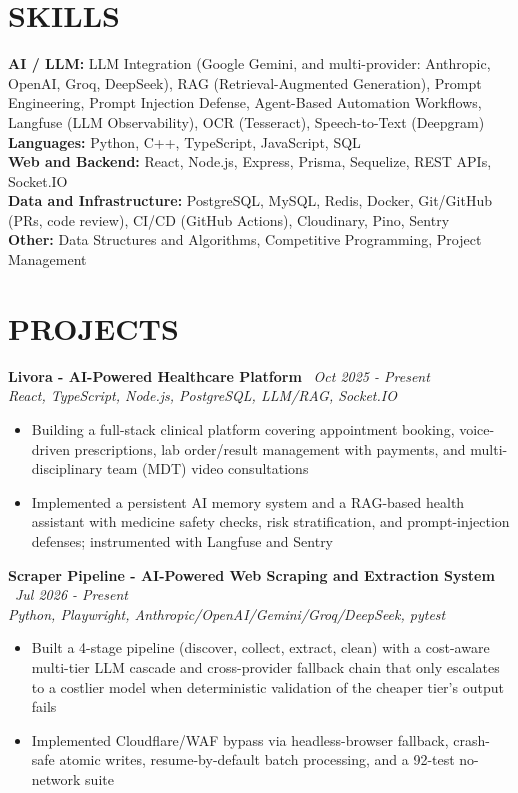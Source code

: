 \documentclass[10.5pt,a4paper]{article}
\newenvironment{tightitemize}{
  \begin{itemize}[leftmargin=15pt, itemsep=1pt, parsep=0pt, topsep=2pt]
}{
  \end{itemize}
}
\newcommand{\entrysimple}[2]{%
  \textbf{#1} \textbar\ \textit{#2}\\[1pt]
}
\begin{document}
\section*{SKILLS}
\textbf{AI / LLM:} LLM Integration (Google Gemini, and multi-provider: Anthropic, OpenAI, Groq, DeepSeek), RAG (Retrieval-Augmented Generation), Prompt Engineering, Prompt Injection Defense, Agent-Based Automation Workflows, Langfuse (LLM Observability), OCR (Tesseract), Speech-to-Text (Deepgram)\\[2pt]
\textbf{Languages:} Python, C++, TypeScript, JavaScript, SQL\\[2pt]
\textbf{Web and Backend:} React, Node.js, Express, Prisma, Sequelize, REST APIs, Socket.IO\\[2pt]
\textbf{Data and Infrastructure:} PostgreSQL, MySQL, Redis, Docker, Git/GitHub (PRs, code review), CI/CD (GitHub Actions), Cloudinary, Pino, Sentry\\[2pt]
\textbf{Other:} Data Structures and Algorithms, Competitive Programming, Project Management

\section*{PROJECTS}

\entrysimple{Livora - AI-Powered Healthcare Platform}{Oct 2025 - Present}
\textit{React, TypeScript, Node.js, PostgreSQL, LLM/RAG, Socket.IO}
\begin{tightitemize}
  \item Building a full-stack clinical platform covering appointment booking, voice-driven prescriptions, lab order/result management with payments, and multi-disciplinary team (MDT) video consultations
  \item Implemented a persistent AI memory system and a RAG-based health assistant with medicine safety checks, risk stratification, and prompt-injection defenses; instrumented with Langfuse and Sentry
\end{tightitemize}

\entrysimple{Scraper Pipeline - AI-Powered Web Scraping and Extraction System}{Jul 2026 - Present}
\textit{Python, Playwright, Anthropic/OpenAI/Gemini/Groq/DeepSeek, pytest}
\begin{tightitemize}
  \item Built a 4-stage pipeline (discover, collect, extract, clean) with a cost-aware multi-tier LLM cascade and cross-provider fallback chain that only escalates to a costlier model when deterministic validation of the cheaper tier's output fails
  \item Implemented Cloudflare/WAF bypass via headless-browser fallback, crash-safe atomic writes, resume-by-default batch processing, and a 92-test no-network suite
\end{tightitemize}
\end{document}
